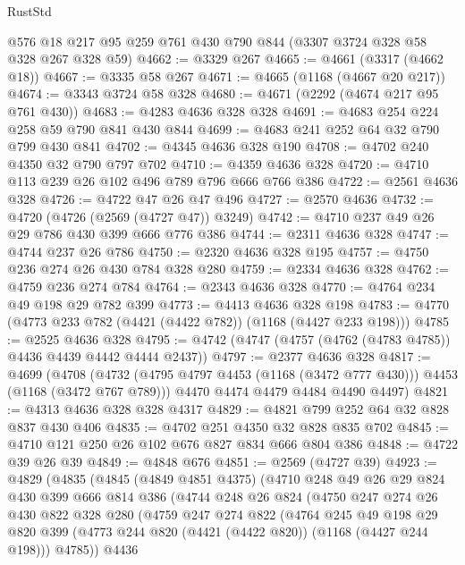 \begin{lexlean}{RustStd}
\begin{coremodule}
    @576
    @18
    @217
    @95
    @259
    @761
    @430
    @790
    @844
    (@3307 @3724 @328 @58 @328 @267 @328 @59)
@4662 := @3329 @267
@4665 := @4661 (@3317 (@4662 @18))
@4667 := @3335 @58 @267
@4671 := @4665 (@1168 (@4667 @20 @217))
@4674 := @3343 @3724 @58 @328
@4680 := @4671 (@2292 (@4674 @217 @95 @761 @430))
@4683 := @4283 @4636 @328 @328
@4691 := @4683 @254 @224 @258 @59 @790 @841 @430 @844
@4699 := @4683 @241 @252 @64 @32 @790 @799 @430 @841
@4702 := @4345 @4636 @328 @190
@4708 := @4702 @240 @4350 @32 @790 @797 @702
@4710 := @4359 @4636 @328
@4720 := @4710 @113 @239 @26 @102 @496 @789 @796 @666 @766 @386
@4722 := @2561 @4636 @328
@4726 := @4722 @47 @26 @47 @496
@4727 := @2570 @4636
@4732 := @4720 (@4726 (@2569 (@4727 @47)) @3249)
@4742 := @4710 @237 @49 @26 @29 @786 @430 @399 @666 @776 @386
@4744 := @2311 @4636 @328
@4747 := @4744 @237 @26 @786
@4750 := @2320 @4636 @328 @195
@4757 := @4750 @236 @274 @26 @430 @784 @328 @280
@4759 := @2334 @4636 @328
@4762 := @4759 @236 @274 @784
@4764 := @2343 @4636 @328
@4770 := @4764 @234 @49 @198 @29 @782 @399
@4773 := @4413 @4636 @328 @198
@4783 := @4770 (@4773 @233 @782 (@4421 (@4422 @782)) (@1168 (@4427 @233 @198)))
@4785 := @2525 @4636 @328
@4795 := @4742 (@4747 (@4757 (@4762 (@4783 @4785)) @4436 @4439 @4442 @4444 @2437))
@4797 := @2377 @4636 @328
@4817 := @4699
    (@4708
      (@4732 (@4795 @4797 @4453 (@1168 (@3472 @777 @430))) @4453 (@1168 (@3472 @767 @789)))
      @4470
      @4474
      @4479
      @4484
      @4490
      @4497)
@4821 := @4313 @4636 @328 @328 @4317
@4829 := @4821 @799 @252 @64 @32 @828 @837 @430 @406
@4835 := @4702 @251 @4350 @32 @828 @835 @702
@4845 := @4710 @121 @250 @26 @102 @676 @827 @834 @666 @804 @386
@4848 := @4722 @39 @26 @39
@4849 := @4848 @676
@4851 := @2569 (@4727 @39)
@4923 := @4829
    (@4835
      (@4845
        (@4849 @4851 @4375)
        (@4710
          @248
          @49
          @26
          @29
          @824
          @430
          @399
          @666
          @814
          @386
          (@4744
            @248
            @26
            @824
            (@4750
              @247
              @274
              @26
              @430
              @822
              @328
              @280
              (@4759
                @247
                @274
                @822
                (@4764
                  @245
                  @49
                  @198
                  @29
                  @820
                  @399
                  (@4773 @244 @820 (@4421 (@4422 @820)) (@1168 (@4427 @244 @198)))
                  @4785))
              @4436

\end{coremodule}
\end{lexlean}
